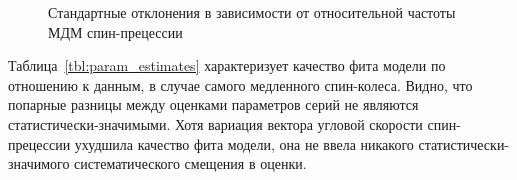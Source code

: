 \begin{figure}[H]
	\centering
	\caption{Стандартные отклонения в зависимости от относительной частоты МДМ спин-прецессии\label{fig:sd}}
\end{figure}

Таблица~\ref{tbl:param_estimates} характеризует качество фита модели по отношению к данным,
в случае самого медленного спин-колеса.
Видно, что попарные разницы между оценками параметров серий не являются статистически-значимыми. Хотя вариация вектора угловой скорости спин-прецессии ухудшила качество фита модели, она не ввела никакого статистически-значимого систематического смещения в оценки.

